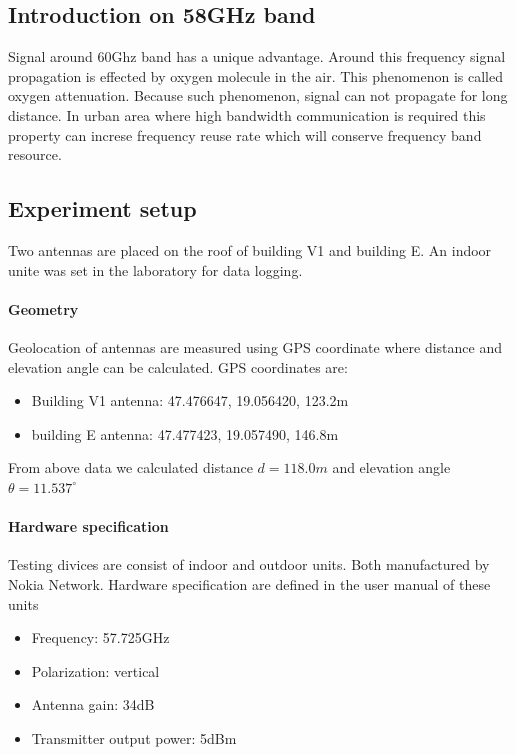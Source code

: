 \documentclass[
11pt, %
a4paper, %
oneside, %
headinclude,footinclude, %
BCOR5mm, %
]{scrartcl}
\begin{document}
\subsection{Introduction on 58GHz band}
Signal around 60Ghz band has a unique advantage. Around this frequency
signal propagation is effected by oxygen molecule in the air. This phenomenon is 
called oxygen attenuation. Because such phenomenon, signal can not propagate for long distance.
In urban area where high bandwidth communication is required this property can increse
frequency reuse rate which will conserve frequency band resource.

\subsection{Experiment setup}
Two antennas are placed on the roof of building V1 and building E.
An indoor unite was set in the laboratory for data logging.

\paragraph{Geometry}
Geolocation of antennas are measured using GPS coordinate where distance and
elevation angle can be calculated.
GPS coordinates are:
\begin{itemize}
    \item Building V1 antenna: 47.476647, 19.056420, 123.2m
    \item building E antenna: 47.477423, 19.057490, 146.8m
\end{itemize}

From above data we calculated distance $d = 118.0m$ 
and elevation angle $\theta = 11.537^\circ$

\paragraph{Hardware specification}
Testing divices are consist of indoor and outdoor units. Both manufactured by 
Nokia Network. Hardware specification are 
defined in the user manual of these units \cite{metrohopper}
\begin{itemize}
    \item Frequency: 57.725GHz
    \item Polarization: vertical
    \item Antenna gain: 34dB
    \item Transmitter output power: 5dBm
\end{itemize}
\end{document}
